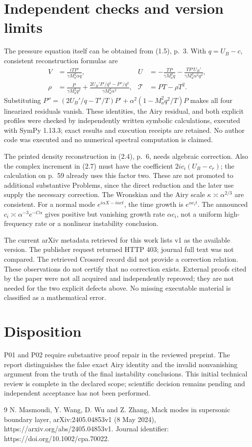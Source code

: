 \documentclass[10pt]{article}
\begin{document}
\section*{Independent checks and version limits}
The pressure equation itself can be obtained from (1.5), p. 3. With \(q=U_B-c\), consistent reconstruction formulas are \[\begin{aligned}
 V&=\frac{iTP'}{\gamma M_a^2\alpha q},&
 U&=-\frac{TP}{\gamma M_a^2q}
     -\frac{TP'U_B'}{\gamma M_a^2\alpha^2q^2},\\
 \rho&=\frac{P}{\gamma M_a^2q^2}
 +\frac{2U_B'P'/q^3-P''/q^2}{\gamma M_a^2\alpha^2},&
 \mathcal T&=PT-\rho T^2.\end{aligned}\] Substituting \(P''=(2U_B'/q-T'/T)P'
+\alpha^2(1-M_a^2q^2/T)P\) makes all four linearized residuals vanish. These identities, the Airy residual, and both explicit profiles were checked by independently written symbolic calculations, executed with SymPy 1.13.3; exact results and execution receipts are retained. No author code was executed and no numerical spectral computation is claimed.\par
The printed density reconstruction in (2.4), p. 6, needs algebraic correction. Also the complex increment in (2.7) must have the coefficient \(2ic_i(U_B-c_r)\); the calculation on p. 59 already uses this factor two. These are not promoted to additional substantive Problems, since the direct reduction and the later use supply the necessary correction. The Wronskian and the Airy scale \(\kappa\asymp\alpha^{2/3}\) are consistent. For a normal mode \(e^{i\alpha X-i\alpha ct}\), the time growth is \(e^{\alpha c_i t}\). The announced \(c_i\asymp\alpha^{-3}e^{-C\alpha}\) gives positive but vanishing growth rate \(\alpha c_i\), not a uniform high-frequency rate or a nonlinear instability conclusion.\par
The current arXiv metadata retrieved for this work lists v1 as the available version. The publisher request returned HTTP 403; journal full text was not compared. The retrieved Crossref record did not provide a correction relation. These observations do not certify that no correction exists. External proofs cited by the paper were not all acquired and independently reproved; they are not needed for the two explicit defects above. No missing executable material is classified as a mathematical error.\par
\section*{Disposition}
P01 and P02 require substantive proof repair in the reviewed preprint. The report distinguishes the false exact Airy identity and the invalid nonvanishing argument from the truth of the final instability conclusions. This initial technical review is complete in the declared scope; scientific decision remains pending and independent acceptance has not been performed.\par
9 N. Masmoudi, Y. Wang, D. Wu and Z. Zhang, Mack modes in supersonic boundary layer, arXiv:2405.04853v1 (8 May 2024), https://arxiv.org/abs/2405.04853v1. Journal identifier: https://doi.org/10.1002/cpa.70022.\par
\end{document}
